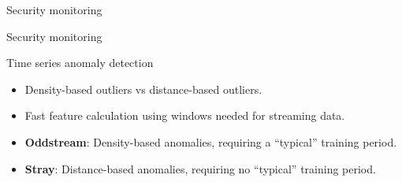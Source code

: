 \documentclass[14pt]{beamer}
\begin{document}

\begin{frame}{Security monitoring}


\end{frame}

\begin{frame}{Security monitoring}


\vspace*{4.2cm}

\hspace*{5.3cm}


\end{frame}

\begin{frame}{Time series anomaly detection}

\begin{itemize}
\item Density-based outliers vs distance-based outliers.

\item Fast feature calculation using windows needed for streaming data.

\item \textbf{Oddstream}: Density-based anomalies, requiring a ``typical'' training period.
\item \textbf{Stray}: Distance-based anomalies, requiring no ``typical'' training period.
\end{itemize}


\end{frame}
\end{document}
